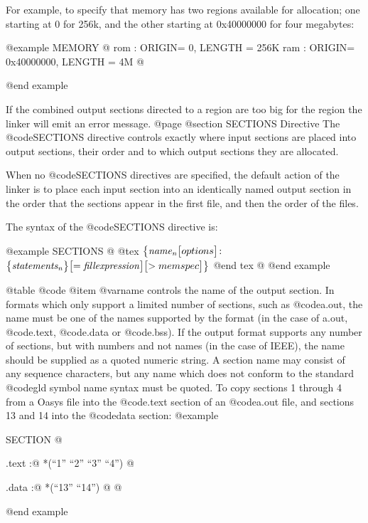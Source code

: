 For example, to specify that memory has two regions available for
allocation; one starting at 0 for 256k, and the other starting at
0x40000000 for four megabytes:

@example
        MEMORY 
                @{
                rom : ORIGIN= 0, LENGTH = 256K
                ram : ORIGIN= 0x40000000, LENGTH = 4M
                @}

@end example

If the combined output sections directed to a region are too big for
the region the linker will emit an error message.
@page
@section SECTIONS Directive
The @code{SECTIONS} directive 
controls exactly where input sections are placed into output sections, their
order and to which output sections they are allocated.

When no @code{SECTIONS} directives are specified, the default action
of the linker is to place each input section into an identically named
output section in the order that the sections appear in the first
file, and then the order of the files.

The syntax of the @code{SECTIONS} directive is:

@example
   SECTIONS
   @{
@tex
    $\bigl\lbrace {\it name_n}\bigl[options\bigr]\colon$ $\bigl\lbrace {\it statements_n} \bigr\rbrace \bigl[ = {\it fill expression } \bigr] \bigl[ > mem spec \bigr] \bigr\rbrace $
@end tex
   @}
@end example

@table @code
@item @var{name}
controls the name of the output section. In formats which only support
a limited number of sections, such as @code{a.out}, the name must be
one of the names supported by the format (in the case of a.out,
@code{.text}, @code{.data} or @code{.bss}). If the output format
supports any number of sections, but with numbers and not names (in
the case of IEEE), the name should be supplied as a quoted numeric
string.  A section name may consist of any sequence characters, but
any name which does not conform to the standard @code{gld} symbol name
syntax must be quoted. To copy sections 1 through 4 from a Oasys file
into the @code{.text} section of an @code{a.out} file, and sections 13
and 14 into the @code{data} section:
@example

        SECTION @{
                .text :@{
                        *(``1'' ``2'' ``3'' ``4'')
                @}

                .data :@{
                        *(``13'' ``14'')
                @}
        @}
@end example

